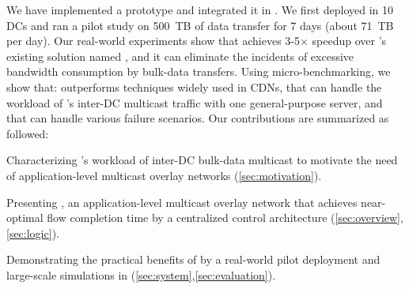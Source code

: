 We have implemented a prototype and integrated it in
\company. We first deployed
\name in 10 DCs and ran a pilot study on 500~TB of data transfer
for 7 days (about 71~TB per day).
Our real-world experiments show that \name achieves 3-5$\times$
speedup over \company's existing solution named \alg, and it can eliminate the
incidents of excessive bandwidth consumption by bulk-data transfers.
Using micro-benchmarking, we show
that: \name outperforms techniques widely used in CDNs, that \name
can handle the workload of \company's inter-DC multicast traffic with
one general-purpose server, and that \name can handle various
failure scenarios.
Our contributions are summarized as followed:
\begin{packeditemize}
\item Characterizing \company's workload of inter-DC bulk-data
multicast to motivate the need of application-level multicast
overlay networks (\Section\ref{sec:motivation}).
\item Presenting \name, an application-level multicast overlay
network that achieves near-optimal flow completion time by a
centralized control architecture
(\Section\ref{sec:overview},\ref{sec:logic}).
\item Demonstrating the practical benefits of \name {} by a real-world
pilot deployment and large-scale simulations in \company (\Section\ref{sec:system},\ref{sec:evaluation}).
\end{packeditemize}
